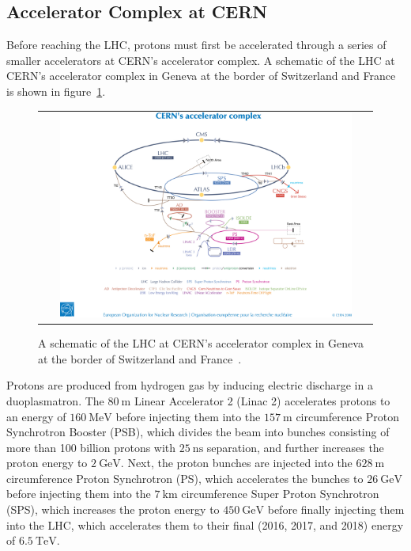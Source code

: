 \subsection{Accelerator Complex at CERN}
Before reaching the LHC, protons must first be accelerated through a series of smaller accelerators at CERN's accelerator complex.
A schematic of the LHC at CERN's accelerator complex in Geneva at the border of Switzerland and France is shown in figure~\ref{CERN_LHC}.
\begin{figure}[htb]
  \begin{center}
    \begin{tabular}{c}
        \includegraphics[width=0.9\textwidth]{fig_LHC_CMS/CERN_LHC.png}
    \end{tabular}
    \caption{A schematic of the LHC at CERN's accelerator complex in Geneva at the border of Switzerland and France~\cite{Christiane:1260465}.
            }
    \label{CERN_LHC}
  \end{center}
\end{figure}
Protons are produced from hydrogen gas by inducing electric discharge in a duoplasmatron.
The $\SI{80}{\m}$ Linear Accelerator 2 (Linac 2) accelerates protons to an energy of $\SI{160}{\MeV}$ before injecting them into the $\SI{157}{\m}$ circumference Proton Synchrotron Booster (PSB), which divides the beam into bunches consisting of more than 100 billion protons with $\SI{25}{\ns}$ separation, and further increases the proton energy to $\SI{2}{\GeV}$.
Next, the proton bunches are injected into the $\SI{628}{\m}$ circumference Proton Synchrotron (PS), which accelerates the bunches to $\SI{26}{\GeV}$ before injecting them into the $\SI{7}{\km}$ circumference Super Proton Synchrotron (SPS), which increases the proton energy to $\SI{450}{\GeV}$ before finally injecting them into the LHC, which accelerates them to their final (2016, 2017, and 2018) energy of $\SI{6.5}{\TeV}$.

